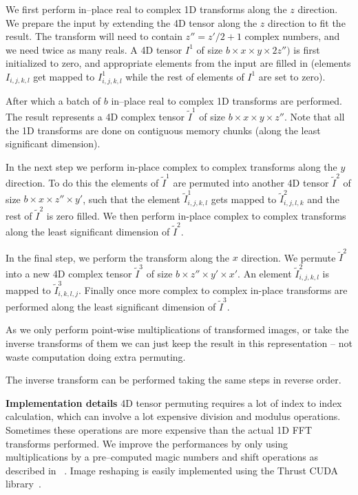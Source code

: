 \documentclass[conference]{IEEEtran}
\begin{document}
We first perform in--place real to complex 1D transforms along the $z$
direction. We prepare the input by extending the 4D tensor along the
$z$ direction to fit the result.  The transform will need to contain
$z'' = z' / 2 + 1$ complex numbers, and we need twice as many reals.
A 4D tensor $I^1$ of size $b \times x \times y \times 2z'')$ is first
initialized to zero, and appropriate elements from the input are
filled in (elements $I_{i,j,k,l}$ get mapped to $I^1_{i,j,k,l}$ while
the rest of elements of $I^1$ are set to zero).

After which a batch of $b$ in--place real to complex 1D transforms are
performed.  The result represents a 4D complex tensor
$\widetilde{I}^1$ of size $b \times x \times y \times z''$.  Note that
all the 1D transforms are done on contiguous memory chunks (along the
least significant dimension).

In the next step we perform in-place complex to complex transforms
along the $y$ direction.  To do this the elements of $\widetilde{I}^1$
are permuted into another 4D tensor $\widetilde{I}^2$ of size
$b \times x \times z'' \times y'$, such that the element
$\widetilde{I}^1_{i,j,k,l}$ gets mapped to $\widetilde{I}^2_{i,j,l,k}$
and the rest of $\widetilde{I}^2$ is zero filled.  We then perform
in-place complex to complex transforms along the least significant
dimension of $\widetilde{I}^2$.

In the final step, we perform the transform along the $x$ direction.
We permute $\widetilde{I}^2$ into a new 4D complex tensor
$\widetilde{I}^3$ of size $b \times z'' \times y' \times x'$.  An
element $\widetilde{I}^2_{i,j,k,l}$ is mapped to
$\widetilde{I}^3_{i,k,l,j}$.  Finally once more complex to complex
in-place transforms are performed along the least significant
dimension of $\widetilde{I}^3$.

As we only perform point-wise multiplications of transformed images,
or take the inverse transforms of them we can just keep the result in
this representation -- not waste computation doing extra permuting.

The inverse transform can be performed taking the same steps in
reverse order.

{\bf Implementation details} 4D tensor permuting requires a lot of
index to index calculation, which can involve a lot expensive division
and modulus operations.  Sometimes these operations are more expensive
than the actual 1D FFT transforms performed.  We improve the
performances by only using multiplications by a pre--computed magic
numbers and shift operations as described in ~\cite{warren2013hacker}.
Image reshaping is easily implemented using the Thrust CUDA
library~\cite{bell2011thrust}.
\end{document}
